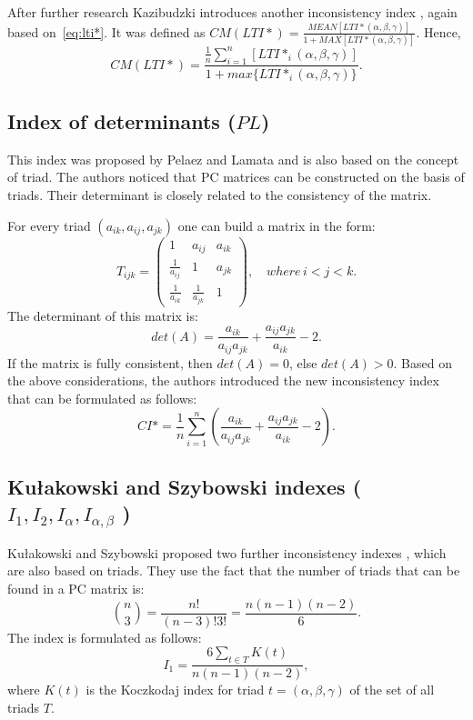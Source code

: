 After further research Kazibudzki introduces another inconsistency index \cite{Kazibudzki2017}, again based on~\ref{eq:lti*}. It was defined as $CM(LTI*)=\frac{MEAN[LTI*(\alpha,\beta,\gamma)]}{1+MAX[LTI*(\alpha,\beta,\gamma)]}$. Hence,
	\begin{equation} 
		CM(LTI*)=\frac{\frac{1}{n}\sum_{i=1}^{n}[LTI*_{i}(\alpha,\beta,\gamma)]}{1+max\{LTI*_{i}(\alpha,\beta,\gamma)\}}.
	 \end{equation}
 

\subsection{Index of determinants ($PL$)}

This index was proposed by Pelaez and Lamata \cite{PELAEZ2003} and is also based on the concept of triad. The authors noticed that PC  matrices can be constructed on the basis of triads. Their determinant is closely related to the consistency of the matrix.

For every triad $(a_{ik},a_{ij},a_{jk})$ one can build a matrix in the form: 
	\begin{equation} 
		T_{ijk}=\left(\begin{array}{ccc}
			1 & a_{ij} & a_{ik}\\
			\frac{1}{a_{ij}} & 1 & a_{jk}\\
			\frac{1}{a_{ik}} & \frac{1}{a_{jk}} & 1
		\end{array}\right),\,\,\,\,\,\,where\,i<j<k.
	\end{equation}
 The determinant of this matrix is:
	\begin{equation} 
		det(A)=\frac{a_{ik}}{a_{ij}a_{jk}}+\frac{a_{ij}a_{jk}}{a_{ik}}-2.
	 \end{equation}
 If the matrix is fully consistent, then $det(A)=0$, else $det(A)>0$. Based on the above considerations, the authors introduced the new inconsistency index that can be formulated as follows:
 	\begin{equation} 
		CI*=\frac{1}{n}\sum_{i=1}^{n}\left(\frac{a_{ik}}{a_{ij}a_{jk}}+\frac{a_{ij}a_{jk}}{a_{ik}}-2\right).
	 \end{equation}
 

\subsection{Kułakowski and Szybowski indexes ($I_1, I_2, I_{\alpha}, I_{\alpha,\beta}$ ) }

Kułakowski and Szybowski proposed two further inconsistency indexes \cite{KULAKOWSKI20141}, which are also based on triads. They use the fact that the number of triads that can be found in a PC matrix is:
	\begin{equation} 
		\label{eq:nPo3}
		\binom{n}{3}=\frac{n!}{(n-3)!3!}=\frac{n(n-1)(n-2)}{6}.
	 \end{equation}
 The index is formulated as follows:
	 \begin{equation} 
	 \label{eq:I1}		
		I_{1}=\frac{6\sum_{t\in T}K(t)}{n(n-1)(n-2)},
	 \end{equation}
 where $K(t)$ is the Koczkodaj index for triad $t=(\alpha,\beta,\gamma)$ of the set of all triads $T$. 

